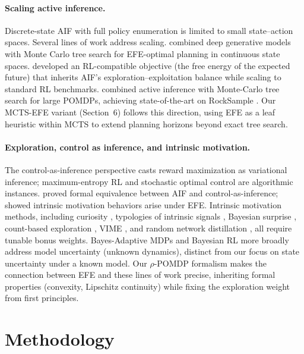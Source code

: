 \documentclass[runningheads]{llncs}
\begin{document}
\paragraph{Scaling active inference.}
Discrete-state AIF with full policy enumeration is limited to small state--action spaces. Several lines of work address scaling. \citet{fountas2020} combined deep generative models with Monte Carlo tree search for EFE-optimal planning in continuous state spaces. \citet{tschantz2020} developed an RL-compatible objective (the free energy of the expected future) that inherits AIF's exploration--exploitation balance while scaling to standard RL benchmarks. \citet{maisto2025} combined active inference with Monte-Carlo tree search for large POMDPs, achieving state-of-the-art on RockSample \citep{smith2004}. Our MCTS-EFE variant (Section~6) follows this direction, using EFE as a leaf heuristic within MCTS to extend planning horizons beyond exact tree search.

\paragraph{Exploration, control as inference, and intrinsic motivation.}
The control-as-inference perspective \citep{todorov2007, levine2018} casts reward maximization as variational inference; maximum-entropy RL \citep{haarnoja2018} and stochastic optimal control \citep{rawlik2012} are algorithmic instances. \citet{millidge2020} proved formal equivalence between AIF and control-as-inference; \citet{sajid2021} showed intrinsic motivation behaviors arise under EFE. Intrinsic motivation methods, including curiosity \citep{schmidhuber1991, pathak2017}, typologies of intrinsic signals \citep{oudeyer2007}, Bayesian surprise \citep{itti2009}, count-based exploration \citep{bellemare2016}, VIME \citep{houthooft2016}, and random network distillation \citep{burda2019}, all require tunable bonus weights. Bayes-Adaptive MDPs \citep{duff2002, guez2013} and Bayesian RL more broadly \citep{ghavamzadeh2015} address model uncertainty (unknown dynamics), distinct from our focus on state uncertainty under a known model. Our $\rho$-POMDP formalism makes the connection between EFE and these lines of work precise, inheriting formal properties (convexity, Lipschitz continuity) while fixing the exploration weight from first principles.

\section{Methodology}
\label{sec:methodology}
\end{document}

